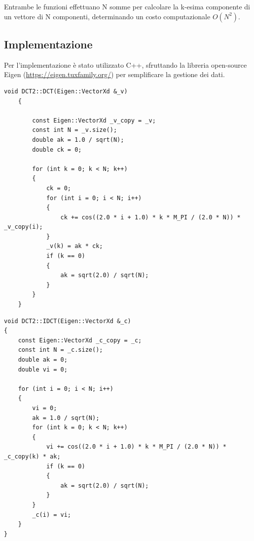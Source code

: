 \documentclass[a4paper,12pt]{report}
\begin{document}
\noindent Entrambe le funzioni effettuano N somme per calcolare la k-esima componente di un vettore di N componenti, determinando un costo computazionale \( O(N^2)\).

\subsection*{Implementazione}
Per l'implementazione è stato utilizzato C++, sfruttando la libreria open-source Eigen (\url{https://eigen.tuxfamily.org/}) per semplificare la gestione dei dati.\\
\begin{lstlisting}[caption={Funzione di calcolo DCT},captionpos=b]
	void DCT2::DCT(Eigen::VectorXd &_v)
	{
	
		const Eigen::VectorXd _v_copy = _v;
		const int N = _v.size();
		double ak = 1.0 / sqrt(N);
		double ck = 0;
	
		for (int k = 0; k < N; k++)
		{
			ck = 0;
			for (int i = 0; i < N; i++)
			{
				ck += cos((2.0 * i + 1.0) * k * M_PI / (2.0 * N)) * _v_copy(i);
			}
			_v(k) = ak * ck;
			if (k == 0)
			{
				ak = sqrt(2.0) / sqrt(N);
			}
		}
	}
\end{lstlisting}
\hfill \break
\begin{lstlisting}[caption={Funzione di calcolo IDCT},captionpos=b]
void DCT2::IDCT(Eigen::VectorXd &_c)
{
    const Eigen::VectorXd _c_copy = _c;
    const int N = _c.size();
    double ak = 0;
    double vi = 0;

    for (int i = 0; i < N; i++)
    {
        vi = 0;
        ak = 1.0 / sqrt(N);
        for (int k = 0; k < N; k++)
        {
            vi += cos((2.0 * i + 1.0) * k * M_PI / (2.0 * N)) * _c_copy(k) * ak;
            if (k == 0)
            {
                ak = sqrt(2.0) / sqrt(N);
            }
        }
        _c(i) = vi;
    }
}
\end{lstlisting}
\end{document}
